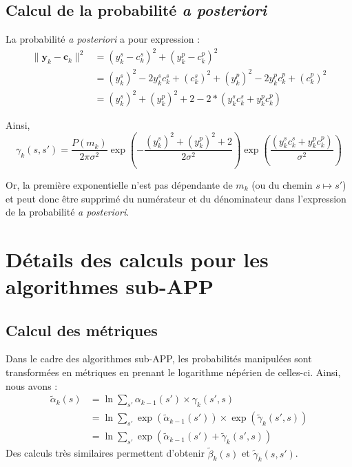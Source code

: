\subsection{Calcul de la probabilité \textit{a posteriori}}
La probabilité \textit{a posteriori} a pour expression : 
\begin{align*}
	\|\mathbf{y}_k-\mathbf{c}_k\|^2 & = (y_k^s - c_k^s)^2 + (y_k^p - c_k^p)^2                                               \\
	                                & = (y_k^s)^2 - 2  y_k^s   c_k^s +  (c_k^s)^2 + (y_k^p)^2 - 2  y_k^p c_k^p +  (c_k^p)^2 \\
	                                & = (y_k^s)^2 +   (y_k^p)^2 + 2  - 2*( y_k^s   c_k^s +  y_k^p c_k^p)                    
\end{align*}

Ainsi, \[\gamma_k(s,s') = \frac{P(m_k)}{2\pi\sigma^2}\exp\left(-\frac{ (y_k^s)^2 +   (y_k^p)^2 + 2}{2\sigma^2}\right) \exp\left(\frac{( y_k^s   c_k^s +  y_k^p c_k^p)}{\sigma^2}\right)\]

Or, la première exponentielle n'est pas dépendante de $m_k$ (ou du chemin $ s \mapsto s'$) et peut donc être supprimé du numérateur et du dénominateur dans l’expression de la probabilité \textit{a posteriori}.


\section{Détails des calculs pour les algorithmes sub-APP}\label{append:subAPP}
\subsection{Calcul des métriques}
Dans le cadre des algorithmes sub-APP, les probabilités manipulées sont transformées en métriques en prenant le logarithme népérien de celles-ci. Ainsi, nous avons :
\begin{align*}
	\tilde{\alpha}_k(s) & = \ln \sum\limits_{s'}\alpha_{k-1}(s')\times\gamma_k(s',s)                                                     \\
	                    & = \ln \sum\limits_{s'} \exp\left(\tilde{\alpha}_{k-1}(s')\right)\times\exp\left(\tilde{\gamma}_k(s', s)\right) \\
	                    & = \ln \sum\limits_{s'} \exp\left(\tilde{\alpha}_{k-1}(s') + \tilde{\gamma}_k(s', s)\right)                     
\end{align*}
Des calculs très similaires permettent d'obtenir $\tilde{\beta}_k(s)$ et $\tilde{\gamma}_k(s,s')$.

